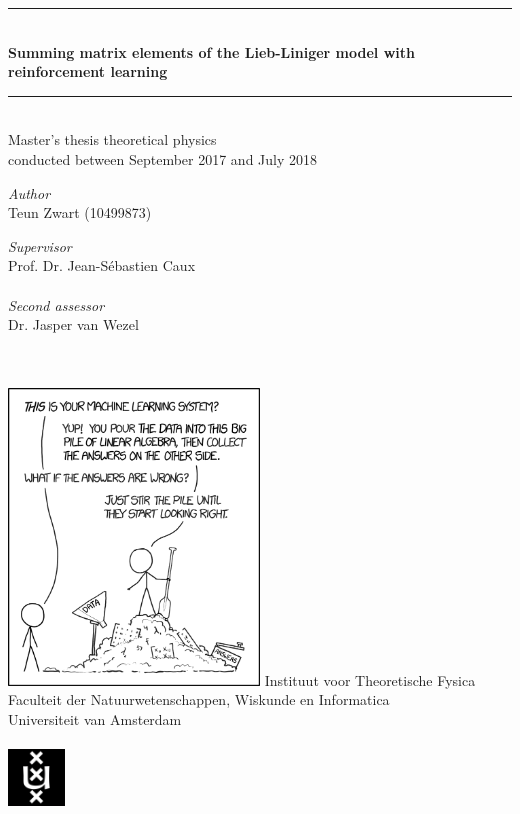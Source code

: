 \documentclass[11pt, a4paper]{report} %
\begin{document}
\begin{titlepage}
	\begin{center}
		\rule{\textwidth}{0.4mm}\\[0.5cm]
		\huge{\textbf{Summing matrix elements of the Lieb-Liniger model with reinforcement learning\\}}
		\rule{\textwidth}{0.4mm}\\[0.5cm]
		\large{Master's thesis theoretical physics\\conducted between September 2017 and July 2018}\\[0.5cm]
		\begin{minipage}[t]{0.4\textwidth}
			\begin{flushleft}
				\large\emph{Author}\\{Teun Zwart (10499873)}
			\end{flushleft}
		\end{minipage}
		\begin{minipage}[t]{0.4\textwidth}
			\begin{flushright}
				\large\emph{Supervisor}\\{Prof. Dr. Jean-Sébastien Caux}\\~\\
				\large\emph{Second assessor}\\{Dr. Jasper van Wezel}\\~\\~\\
			\end{flushright}
		\end{minipage}
		\includegraphics[width=0.5\textwidth]{machine_learning_2x.png}
		\vfill
		\large{Instituut voor Theoretische Fysica}\\
		\large{Faculteit der Natuurwetenschappen, Wiskunde en Informatica}\\
		\large{Universiteit van Amsterdam}\\~\\
		\includegraphics[width=1.5cm]{UvA-logo.png}
	\end{center}
\end{titlepage}
\end{document}
